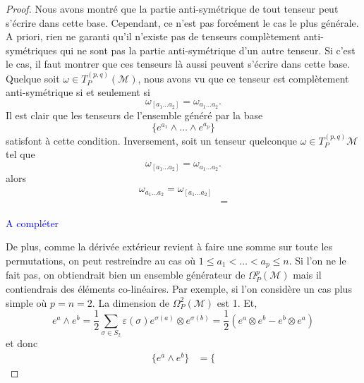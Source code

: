 \documentclass[a4paper,11pt]{report}
\theoremstyle{definition}
\theoremstyle{plain}
\theoremstyle{definition}
\theoremstyle{remark}
\newcommand{\comp}{\begin{center}\textcolor{blue}{A compléter}\end{center}}
\newcommand{\M}{\mathscr{M}}
\begin{document}
            \begin{proof}
                Nous avons montré que la partie anti-symétrique de tout tenseur peut s'écrire dans cette base. Cependant, ce n'est pas forcément le cas le plus générale. A priori, rien ne garanti qu'il n'existe pas de tenseurs complètement anti-symétriques qui ne sont pas la partie anti-symétrique d'un autre tenseur. Si c'est le cas, il faut montrer que ces tenseurs là aussi peuvent s'écrire dans cette base. Quelque soit $\omega\in T^{(p,q)}_P(\M)$, nous avons vu que ce tenseur est complètement anti-symétrique si et seulement si
                \begin{equation}
                    \omega_{[a_1\dots a_2]} = \omega_{a_1\dots a_2}.
                \end{equation}
                Il est clair que les tenseurs de l'ensemble généré par la base
                \begin{equation}
                    \{e^{a_1}\wedge \dots\wedge e^{a_{p}}\}
                \end{equation}
                satisfont à cette condition. Inversement, soit un tenseur quelconque $\omega\in T^{(p,q)}_P\M$ tel que
                \begin{equation}
                    \omega_{[a_1\dots a_2]} = \omega_{a_1\dots a_2}.
                \end{equation}
                alors
                \begin{align}
                     \omega_{a_1\dots a_2} =  \omega_{[a_1\dots a_2]}\\
                     &= 
                \end{align}
                \comp
                De plus, comme la dérivée extérieur revient à faire une somme sur toute les permutations, on peut restreindre au cas où $1\leq a_1<\dots<a_p\leq n$. Si l'on ne le fait pas, on obtiendrait bien un ensemble générateur de $\Omega_P^p(\M)$ mais il contiendrais des éléments co-linéaires. Par exemple, si l'on considère un cas plus simple où $p=n=2$. La dimension de $\Omega_P^2(\M)$ est 1. Et,
                \begin{equation}
                    e^a\wedge e^b = \frac{1}{2}\sum_{\sigma\in S_2} \varepsilon(\sigma)e^{\sigma(a)}\otimes e^{\sigma(b)} = \frac{1}{2}\left( e^a\otimes e^b - e^b\otimes e^a \right)
                \end{equation}
                et donc
                \begin{align}
                    \{e^a\wedge e^b\} &= \bigg\{ 

\end{align}
\end{proof}
\end{document}
